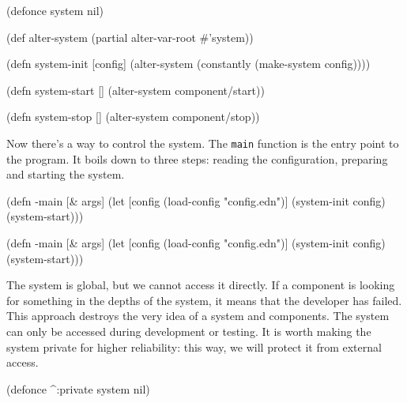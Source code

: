 \begin{english}
  \begin{clojure}
(defonce system nil)

(def alter-system (partial alter-var-root #'system))

(defn system-init [config]
  (alter-system (constantly (make-system config))))

(defn system-start []
  (alter-system component/start))

(defn system-stop []
  (alter-system component/stop))
  \end{clojure}
\end{english}

\fi


Now there's a way to control the system. The \verb|main| function is the entry point to the program. It boils down to three steps: reading the configuration, preparing and starting the system.

\ifnarrow

\begin{english}
  \begin{clojure}
(defn -main [& args]
  (let [config
        (load-config "config.edn")]
    (system-init config)
    (system-start)))
  \end{clojure}
\end{english}

\else

\begin{english}
  \begin{clojure}
(defn -main [& args]
  (let [config (load-config "config.edn")]
    (system-init config)
    (system-start)))
  \end{clojure}
\end{english}

\fi

The system is global, but we cannot access it directly. If a component is looking for something in the depths of the system, it means that the developer has failed. This approach destroys the very idea of a system and components. The system can only be accessed during development or testing. It is worth making the system private for higher reliability: this way, we will protect it from external access.


\begin{english}
  \begin{clojure}
(defonce ^:private system nil)
  \end{clojure}
\end{english}

